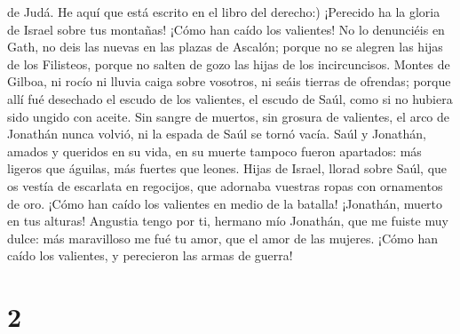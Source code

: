 de Judá. He aquí que está escrito en el libro del derecho:)
 ¡Perecido ha la gloria de Israel sobre tus montañas!
¡Cómo han caído los valientes!  No lo denunciéis en Gath,
no deis las nuevas en las plazas de Ascalón; porque no se alegren las
hijas de los Filisteos, porque no salten de gozo las hijas de los
incircuncisos.  Montes de Gilboa, ni rocío ni lluvia
caiga sobre vosotros, ni seáis tierras de ofrendas; porque allí fué
desechado el escudo de los valientes, el escudo de Saúl, como si no
hubiera sido ungido con aceite.  Sin sangre de muertos,
sin grosura de valientes, el arco de Jonathán nunca volvió, ni la espada
de Saúl se tornó vacía.  Saúl y Jonathán, amados y
queridos en su vida, en su muerte tampoco fueron apartados: más ligeros
que águilas, más fuertes que leones.  Hijas de Israel,
llorad sobre Saúl, que os vestía de escarlata en regocijos, que adornaba
vuestras ropas con ornamentos de oro.  ¡Cómo han caído
los valientes en medio de la batalla! ¡Jonathán, muerto en tus alturas!
 Angustia tengo por ti, hermano mío Jonathán, que me
fuiste muy dulce: más maravilloso me fué tu amor, que el amor de las
mujeres.  ¡Cómo han caído los valientes, y perecieron las
armas de guerra!

\hypertarget{section-1}{%
\section{2}\label{section-1}}

